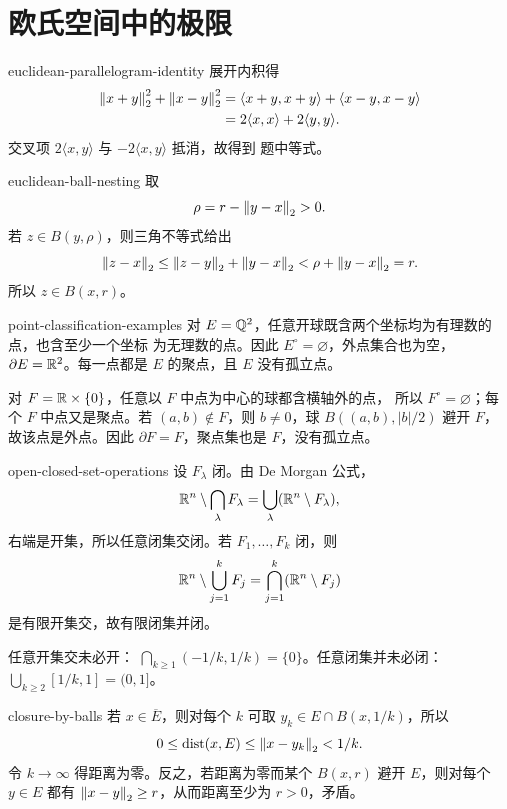 \chapter{欧氏空间中的极限}
\label{chap:euclidean-limits-solutions}

\begin{solution}{euclidean-parallelogram-identity}
展开内积得
\[
\begin{aligned}
 \left\lVert x+y\right\rVert_2^2+\left\lVert x-y\right\rVert_2^2
 &=\langle x+y,x+y\rangle+\langle x-y,x-y\rangle\\
 &=2\langle x,x\rangle+2\langle y,y\rangle.
\end{aligned}
\]
交叉项 \(2\langle x,y\rangle\) 与 \(-2\langle x,y\rangle\) 抵消，故得到
题中等式。
\end{solution}

\begin{solution}{euclidean-ball-nesting}
取
\[
 \rho=r-\left\lVert y-x\right\rVert_2>0.
\]
若 \(z\in B(y,\rho)\)，则三角不等式给出
\[
 \left\lVert z-x\right\rVert_2\le\left\lVert z-y\right\rVert_2+\left\lVert y-x\right\rVert_2
 <\rho+\left\lVert y-x\right\rVert_2=r.
\]
所以 \(z\in B(x,r)\)。
\end{solution}

\begin{solution}{point-classification-examples}
对 \(E=\mathbb{Q}^2\)，任意开球既含两个坐标均为有理数的点，也含至少一个坐标
为无理数的点。因此 \(E^\circ=\varnothing\)，外点集合也为空，
\(\partial E=\mathbb{R}^2\)。每一点都是 \(E\) 的聚点，且 \(E\) 没有孤立点。

对 \(F=\mathbb{R}\times\{0\}\)，任意以 \(F\) 中点为中心的球都含横轴外的点，
所以 \(F^\circ=\varnothing\)；每个 \(F\) 中点又是聚点。若
\((a,b)\notin F\)，则 \(b\ne0\)，球 \(B((a,b),|b|/2)\) 避开 \(F\)，
故该点是外点。因此 \(\partial F=F\)，聚点集也是 \(F\)，没有孤立点。
\end{solution}

\begin{solution}{open-closed-set-operations}
设 \(F_\lambda\) 闭。由 De Morgan 公式，
\[
 \mathbb{R}^n\setminus\bigcap_\lambda F_\lambda
 =\bigcup_\lambda(\mathbb{R}^n\setminus F_\lambda),
\]
右端是开集，所以任意闭集交闭。若 \(F_1,\ldots,F_k\) 闭，则
\[
 \mathbb{R}^n\setminus\bigcup_{j=1}^kF_j
 =\bigcap_{j=1}^k(\mathbb{R}^n\setminus F_j)
\]
是有限开集交，故有限闭集并闭。

任意开集交未必开：
\(\bigcap_{k\ge1}(-1/k,1/k)=\{0\}\)。任意闭集并未必闭：
\(\bigcup_{k\ge2}[1/k,1]=(0,1]\)。
\end{solution}

\begin{solution}{closure-by-balls}
若 \(x\in\overline E\)，则对每个 \(k\) 可取
\(y_k\in E\cap B(x,1/k)\)，所以
\[
 0\le\operatorname{dist}(x,E)\le\left\lVert x-y_k\right\rVert_2<1/k.
\]
令 \(k\to\infty\) 得距离为零。反之，若距离为零而某个
\(B(x,r)\) 避开 \(E\)，则对每个 \(y\in E\) 都有
\(\left\lVert x-y\right\rVert_2\ge r\)，从而距离至少为 \(r>0\)，矛盾。
\end{solution}

